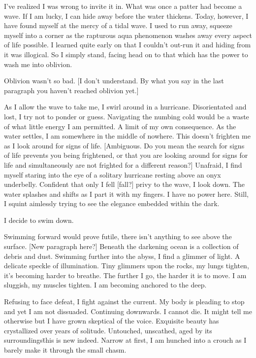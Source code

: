 I've realized I was wrong to invite it in. What was once a patter had
become a wave. If I am lucky, I can hide away before the water
thickens. Today, however, I have found myself at the mercy of a tidal
wave. I used to run away, squeeze myself into a corner as the
rapturous aqua phenomenon washes away every aspect of life possible. I
learned quite early on that I couldn't out-run it and hiding from it
was illogical. So I simply stand, facing head on to that which has the power to
wash me into oblivion.

Oblivion wasn't so bad. [I don't understand.  By what you say in the last paragraph you haven't reached oblivion yet.]

As I allow the wave to take me, I swirl around in a
hurricane. Disorientated and lost, I try not to ponder or
guess. Navigating the numbing cold would be a waste of what little
energy I am permitted.  A limit of my own consequence. As the water
settles, I am somewhere in the middle of nowhere. This doesn't
frighten me as I look around for signs of life. [Ambiguous. Do you mean the search for signs of life
  prevents you being frightened, or that you are looking around for signs for life and simultaneously
are not frighted for a different reason?] Unafraid, I find
myself staring into the eye of a solitary hurricane resting above an
onyx underbelly. Confident that only I fell [fall?] privy to the wave, I look
down. The water splashes and shifts as I part it with my fingers. I
have no power here. Still, I squint aimlessly trying to see the
elegance embedded within the dark.

I decide to swim down.

Swimming forward would prove futile, there isn't anything to see above
the surface. [New paragraph here?] Beneath the darkening ocean is a collection of debris
and dust. Swimming further into the abyss, I find a glimmer of
light. A delicate speckle of illumination. Tiny glimmers upon the
rocks, my lungs tighten, it's becoming harder to breathe. The further
I go, the harder it is to move. I am sluggish, my muscles tighten. I
am becoming anchored to the deep.

Refusing to face defeat, I fight against the current. My body is
pleading to stop and yet I am not dissuaded. Continuing downwards. I
cannot die. It might tell me otherwise but I have grown skeptical of
the voice. Exquisite beauty has crystallized over years of
solitude. Untouched, unscathed, aged by its surroundings\=this is
new indeed.  Narrow at first, I am hunched into a crouch as I
barely make it through the small chasm.

